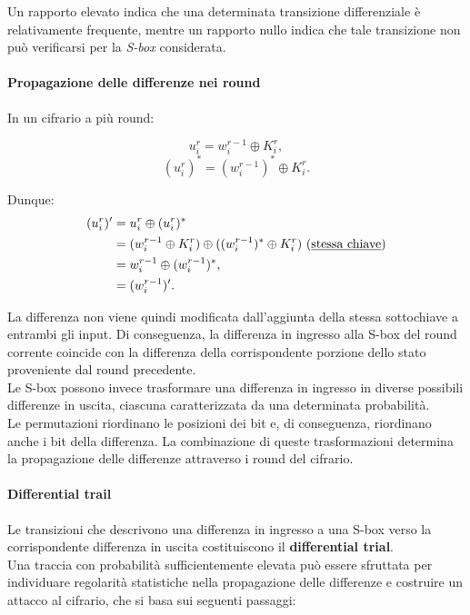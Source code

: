 \noindent Un rapporto elevato indica che una determinata transizione differenziale
è relativamente frequente, mentre un rapporto nullo indica che tale
transizione non può verificarsi per la \textit{S-box} considerata.

\paragraph{Propagazione delle differenze nei round}

In un cifrario a più round:

\[
u_i^r = w_i^{r-1} \oplus K_i^r,
\]
\[
(u_i^r)^* = (w_i^{r-1})^* \oplus K_i^r.
\]

Dunque:
\[
\begin{aligned}
(u_i^r)'
&= u_i^r \oplus (u_i^r)^*\\
&= (w_i^{r-1} \oplus K_i^r)
   \oplus ((w_i^{r-1})^* \oplus K_i^r) \ \text{(\underline{stessa chiave})}\\
&= w_i^{r-1} \oplus (w_i^{r-1})^*, \\
&= (w_i^{r-1})'.
\end{aligned}
\]

\noindent La differenza non viene quindi modificata dall'aggiunta della stessa sottochiave a entrambi gli input. Di conseguenza, la differenza in
ingresso alla S-box del round corrente coincide con la differenza
della corrispondente porzione dello stato proveniente dal round precedente. \\ Le S-box possono invece trasformare una differenza in ingresso in
diverse possibili differenze in uscita, ciascuna caratterizzata da
una determinata probabilità.\\ Le permutazioni riordinano le posizioni dei bit e, di conseguenza,
riordinano anche i bit della differenza. La combinazione di queste
trasformazioni determina la propagazione delle differenze attraverso
i round del cifrario.

\paragraph{Differential trail} Le transizioni che descrivono una differenza in ingresso a una S-box verso la corrispondente differenza in uscita costituiscono il \textbf{differential trial}. \\ Una traccia con probabilità sufficientemente elevata può essere
sfruttata per individuare regolarità statistiche nella propagazione
delle differenze e costruire un attacco al cifrario, che si basa sui seguenti passaggi:

